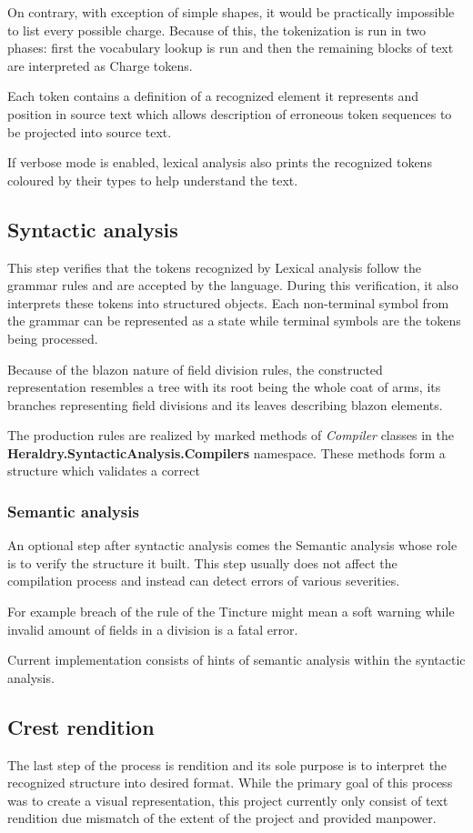 \documentclass[12pt,a4paper]{article}
\begin{document}
On contrary, with exception of simple shapes, it would be practically impossible to list every possible charge.
Because of this, the tokenization is run in two phases: first the vocabulary lookup is run and then the remaining blocks of text are interpreted as Charge tokens.

Each token contains a definition of a recognized element it represents and position in source text which allows description of erroneous token sequences to be projected into source text.

If verbose mode is enabled, lexical analysis also prints the recognized tokens coloured by their types to help understand the text.


\subsection{Syntactic analysis} 
This step verifies that the tokens recognized by Lexical analysis follow the grammar rules and are accepted by the language. During this verification, it also interprets these tokens into structured objects.
Each non-terminal symbol from the grammar can be represented as a state while terminal symbols are the tokens being processed.

Because of the blazon nature of field division rules, the constructed representation resembles a tree with its root being the whole coat of arms, its branches representing field divisions and its leaves describing blazon elements.

The production rules are realized by marked methods of \textit{Compiler} classes in the \textbf{Heraldry.SyntacticAnalysis.Compilers} namespace. These methods form a structure which validates a correct 

\subsubsection{Semantic analysis} 
An optional step after syntactic analysis comes the Semantic analysis whose role is to verify the structure it built.
This step usually does not affect the compilation process and instead can detect errors of various severities.

For example breach of the rule of the Tincture might mean a soft warning while invalid amount of fields in a division is a fatal error.

Current implementation consists of hints of semantic analysis within the syntactic analysis.

\subsection{Crest rendition}
The last step of the process is rendition and its sole purpose is to interpret the recognized structure into desired format.
While the primary goal of this process was to create a visual representation, this project currently only consist of text rendition due mismatch of the extent of the project and provided manpower.
\end{document}
